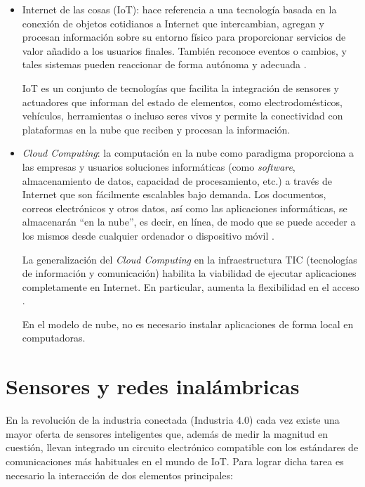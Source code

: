 \begin{itemize}
\item Internet de las cosas (IoT): hace referencia a una tecnología basada en la conexión de objetos cotidianos a Internet que intercambian, agregan y procesan información sobre su entorno físico para proporcionar servicios de valor añadido a los usuarios finales. También reconoce eventos o cambios, y tales sistemas pueden reaccionar de forma autónoma y adecuada \citep{BOOK:1}.

IoT es un conjunto de tecnologías que facilita la integración de sensores y actuadores que informan del estado de elementos, como electrodomésticos, vehículos, herramientas o incluso seres vivos y permite la conectividad con plataformas en la nube que reciben y procesan la información.

\item \emph{Cloud Computing}: la computación en la nube como paradigma proporciona a las empresas y usuarios soluciones informáticas (como \emph{software}, almacenamiento de datos, capacidad de procesamiento, etc.) a través de Internet que son fácilmente escalables bajo demanda. Los documentos, correos electrónicos y otros datos, así como las aplicaciones informáticas, se almacenarán ``en la nube'', es decir, en línea, de modo que se puede acceder a los mismos desde cualquier ordenador o dispositivo móvil \citep{BOOK:1}.

La generalización del \emph{Cloud Computing} en la infraestructura TIC (tecnologías de información y comunicación) habilita la viabilidad de ejecutar aplicaciones completamente en Internet. En particular, aumenta la flexibilidad en el acceso \citep{BOOK:1}.


En el modelo de nube, no es necesario instalar aplicaciones de forma local en computadoras.

\end{itemize}

\section{Sensores y redes inalámbricas}

En la revolución de la industria conectada (Industria 4.0) \citep{WEBSITE:31}  cada vez existe una mayor oferta de sensores inteligentes que, además de medir la magnitud en cuestión, llevan integrado un circuito electrónico compatible con los estándares de comunicaciones más habituales en el mundo de IoT. Para lograr dicha tarea es necesario la interacción de dos elementos principales:

